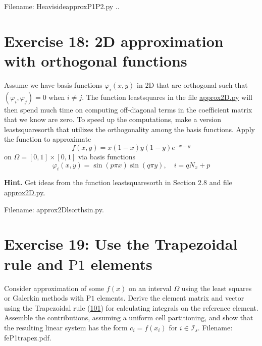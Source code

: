 \documentclass[../main.tex]{subfiles}
\begin{document}
	Filename: Heaviside\textunderscore approx\textunderscore P1P2.py ..
	\bigbreak
	\section*{Exercise 18: 2D approximation with orthogonal functions}
	\label{sec:sec_10_18}
	\noindent Assume we have basis functions $\varphi_{i}(x, y)$ in $2 \mathrm{D}$ that are orthogonal such that $\left(\varphi_{i}, \varphi_{j}\right)=0$ when $i \neq j$. The function least\textunderscore squares in the file \href{http://tinyurl.com/jvzzcfn/fem/fe_approx2D.py}{approx2D.py} will then spend much time on computing off-diagonal terms in the coefficient matrix that we know are zero. To speed up the computations, make a version least\textunderscore squares\textunderscore orth that utilizes the orthogonality among the basis functions. Apply the function to approximate
	$$
	f(x, y)=x(1-x) y(1-y) e^{-x-y}
	$$
	on $\Omega=[0,1] \times[0,1]$ via basis functions
	$$
	\varphi_{i}(x, y)=\sin (p \pi x) \sin (q \pi y), \quad i=q N_{x}+p
	$$
	
	\noindent \textbf{Hint.} Get ideas from the function least\textunderscore squares\textunderscore orth in Section 2.8 and
	file \href{http://tinyurl.com/jvzzcfn/fem/fe_approx2D.py}{approx2D.py.}
	
	Filename: approx2D\textunderscore lsorth\textunderscore sin.py.
	\bigbreak
	\section*{Exercise 19: Use the Trapezoidal rule and $\mathrm{P} 1$ elements}
	\label{sec:sec_10_19}
	\noindent Consider approximation of some $f(x)$ on an interval $\Omega$ using the least squares or Galerkin methods with $\mathrm{P} 1$ elements. Derive the element matrix and vector using the Trapezoidal rule (\hyperref[eqa101]{101}) for calculating integrals on the reference element. Assemble the contributions, assuming a uniform cell partitioning, and show that the resulting linear system has the form $c_{i}=f\left(x_{i}\right)$ for $i \in \mathcal{I}_{s}$. Filename: fe\textunderscore P1\textunderscore trapez.pdf.
	\bigbreak
\end{document}
